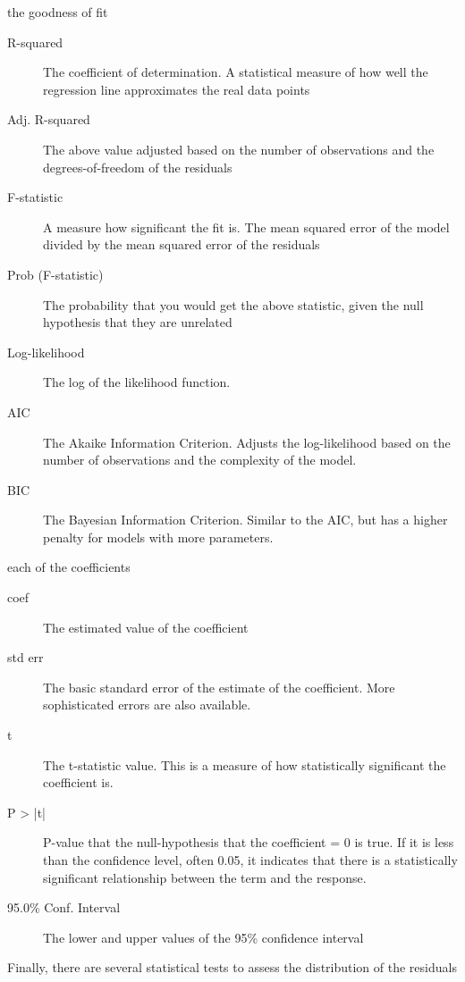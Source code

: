 \begin{refsection}
 the goodness of fit
\begin{description}
	\item[R-squared] The coefficient of determination. A statistical measure of how well the regression line approximates the real data points
	\item[Adj. R-squared]	The above value adjusted based on the number of observations and the degrees-of-freedom of the residuals
	\item[F-statistic]	A measure how significant the fit is. The mean squared error of the model divided by the mean squared error of the residuals
	\item[Prob (F-statistic)]	The probability that you would get the above statistic, given the null hypothesis that they are unrelated
	\item[Log-likelihood]	The log of the likelihood function.
	\item[AIC]	The Akaike Information Criterion. Adjusts the log-likelihood based on the number of observations and the complexity of the model.
	\item[BIC]	The Bayesian Information Criterion. Similar to the AIC, but has a higher penalty for models with more parameters.
\end{description}	

each of the coefficients
\begin{description}
	\item[coef]	The estimated value of the coefficient
	\item[std err]	The basic standard error of the estimate of the coefficient. More sophisticated errors are also available.
	\item[t]	The t-statistic value. This is a measure of how statistically significant the coefficient is.
	\item[P > |t|]	P-value that the null-hypothesis that the coefficient = 0 is true. If it is less than the confidence level, often 0.05, it indicates that there is a statistically significant relationship between the term and the response.
	\item[95.0\% Conf. Interval]	
	The lower and upper values of the 95\% confidence interval
\end{description}	
	
	
	Finally, there are several statistical tests to assess the distribution of the residuals
	

\end{refsection}
